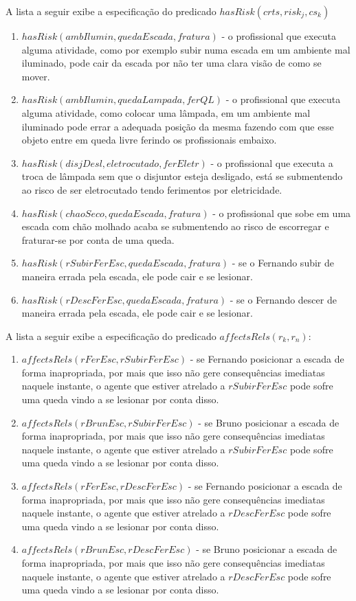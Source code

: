 A lista a seguir exibe a especificação do predicado $hasRisk(crts,risk_j,cs_k)$

\begin{enumerate}
	\item $hasRisk(ambIlumin,quedaEscada,fratura)$ - o profissional que executa alguma atividade, como por exemplo subir numa escada em um ambiente mal iluminado, pode cair da escada por não ter uma clara visão de como se mover. 
	\item $hasRisk(ambIlumin,quedaLampada,ferQL)$ - o profissional que executa alguma atividade, como colocar uma lâmpada, em um ambiente mal iluminado pode errar a adequada posição da mesma fazendo com que esse objeto entre em queda livre ferindo os profissionais embaixo.
	\item $hasRisk(disjDesl, eletrocutado, ferEletr)$ - o profissional que executa a troca de lâmpada sem que o disjuntor esteja desligado, está se submentendo ao risco de ser eletrocutado tendo ferimentos por eletricidade.
	\item $hasRisk(chaoSeco,quedaEscada,fratura)$ - o profissional que sobe em uma escada com chão molhado acaba se submentendo ao risco de escorregar e fraturar-se por conta de uma queda.
	\item $hasRisk(rSubirFerEsc,quedaEscada,fratura)$ - se o Fernando subir de maneira errada pela escada, ele pode cair e se lesionar. 
	\item $hasRisk(rDescFerEsc,quedaEscada,fratura)$ - se o Fernando descer de maneira errada pela escada, ele pode cair e se lesionar. 		
\end{enumerate}

A lista a seguir exibe a especificação do predicado $affectsRels(r_k,r_n)$:

\begin{enumerate}
	\item $affectsRels(rFerEsc,rSubirFerEsc)$ - se Fernando posicionar a escada de forma inapropriada, por mais que isso não gere consequências imediatas naquele instante, o agente que estiver atrelado a $rSubirFerEsc$ pode sofre uma queda vindo a se lesionar por conta disso. 
	\item $affectsRels(rBrunEsc,rSubirFerEsc)$ - se Bruno posicionar a escada de forma inapropriada, por mais que isso não gere consequências imediatas naquele instante, o agente que estiver atrelado a $rSubirFerEsc$ pode sofre uma queda vindo a se lesionar por conta disso. 
	\item $affectsRels(rFerEsc,rDescFerEsc)$ - se Fernando posicionar a escada de forma inapropriada, por mais que isso não gere consequências imediatas naquele instante, o agente que estiver atrelado a $rDescFerEsc$ pode sofre uma queda vindo a se lesionar por conta disso. 
	\item $affectsRels(rBrunEsc,rDescFerEsc)$ - se Bruno posicionar a escada de forma inapropriada, por mais que isso não gere consequências imediatas naquele instante, o agente que estiver atrelado a $rDescFerEsc$ pode sofre uma queda vindo a se lesionar por conta disso. 
\end{enumerate}

